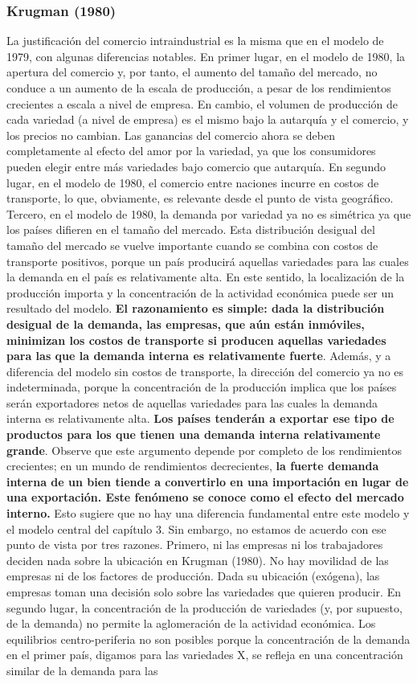\subsubsection{Krugman (1980)}
La justificación del comercio intraindustrial es la misma que en el modelo de 1979, con algunas diferencias notables. En primer lugar, en el modelo de 1980, la apertura del comercio y, por tanto, el aumento del tamaño del mercado, no conduce a un aumento de la escala de producción, a pesar de los rendimientos crecientes a escala a nivel de empresa. En cambio, el volumen de producción de cada variedad (a nivel de empresa) es el mismo bajo la autarquía y el comercio, y los precios no cambian. Las ganancias del comercio ahora se deben completamente al efecto del amor por la variedad, ya que los consumidores pueden elegir entre más variedades bajo comercio que autarquía. En segundo lugar, en el modelo de 1980, el comercio entre naciones incurre en costos de transporte, lo que, obviamente, es relevante desde el punto de vista geográfico. Tercero, en el modelo de 1980, la demanda por variedad ya no es simétrica ya que los países difieren en el tamaño del mercado. Esta distribución desigual del tamaño del mercado se vuelve importante cuando se combina con costos de transporte positivos, porque un país producirá aquellas variedades para las cuales la demanda en el país es relativamente alta. En este sentido, la localización de la producción importa y la concentración de la actividad económica puede ser un resultado del modelo. \textbf{El razonamiento es simple: dada la distribución desigual de la demanda, las empresas, que aún están inmóviles, minimizan los costos de transporte si producen aquellas variedades para las que la demanda interna es relativamente fuerte}. Además, y a diferencia del modelo sin costos de transporte, la dirección del comercio ya no es indeterminada, porque la concentración de la producción implica que los países serán exportadores netos de aquellas variedades para las cuales la demanda interna es relativamente alta. \textbf{Los países tenderán a exportar ese tipo de productos para los que tienen una demanda interna relativamente grande}. Observe que este argumento depende por completo de los rendimientos crecientes; en un mundo de rendimientos decrecientes, \textbf{la fuerte demanda interna de un bien tiende a convertirlo en una importación en lugar de una exportación. Este fenómeno se conoce como el efecto del mercado interno.} Esto sugiere que no hay una diferencia fundamental entre este modelo y el modelo central del capítulo 3. Sin embargo, no estamos de acuerdo con ese punto de vista por tres razones. Primero, ni las empresas ni los trabajadores deciden nada sobre la ubicación en Krugman (1980). No hay movilidad de las empresas ni de los factores de producción. Dada su ubicación (exógena), las empresas toman una decisión solo sobre las variedades que quieren producir. En segundo lugar, la concentración de la producción de variedades (y, por supuesto, de la demanda) no permite la aglomeración de la actividad económica. Los equilibrios centro-periferia no son posibles porque la concentración de la demanda en el primer país, digamos para las variedades X, se refleja en una concentración similar de la demanda para las 